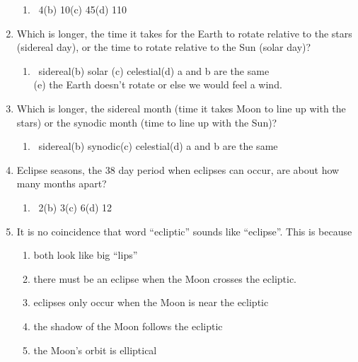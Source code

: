 \documentclass[12pt,thmsa]{article}
\begin{document}
\begin{enumerate}
\begin{enumerate}
\item  \ 4\qquad (b) 10\qquad (c) 45\qquad (d) 110\qquad
\end{enumerate}

\item  Which is longer, the time it takes for the Earth to rotate
relative to the stars (sidereal day), or the time to rotate relative
to the Sun (solar day)?
\begin{enumerate}
\item  \ sidereal\qquad (b) solar \qquad (c) celestial\qquad (d) a and b
are the same \\
(e) the Earth doesn't rotate or else we would feel a wind.
\end{enumerate}

\item  Which is longer, the sidereal month (time it takes Moon to line up
with the stars) or the synodic month (time to line up with the Sun)?

\begin{enumerate}
\item  \ sidereal\qquad (b) synodic\qquad (c) celestial\qquad (d) a and b
are the same\qquad
\end{enumerate}

\item  Eclipse seasons, the 38 day period when eclipses can occur, are about
how many months apart?

\begin{enumerate}
\item  \ 2\qquad (b) 3\qquad (c) 6\qquad (d) 12\qquad
\end{enumerate}

\item  It is no coincidence that word ``ecliptic'' sounds like ``eclipse''.
This is because

\begin{enumerate}
\item  both look like big ``lips''
\item  there must be an eclipse when the Moon crosses the ecliptic.
\item  eclipses only occur when the Moon is near the ecliptic
\item  the shadow of the Moon follows the ecliptic
\item  the Moon's orbit is elliptical
\end{enumerate}


\end{enumerate}
\end{document}
